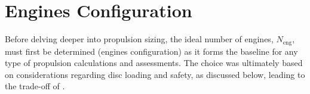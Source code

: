 

\section{Engines Configuration}
\label{sec:enginesconfigchoice}
Before delving deeper into propulsion sizing, the ideal number of engines, $N_{\text{eng}}$, must first be determined (engines configuration) as it forms the baseline for any type of propulsion calculations and assessments.
The choice was ultimately based on considerations regarding disc loading and safety, as discussed below, leading to the trade-off of .

